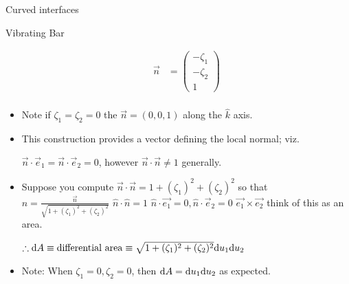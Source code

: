 \documentclass{article}
\begin{document}
\begin{section}{Curved interfaces}
\begin{subsection}{Vibrating Bar}
\begin{itemize}
\begin{align*}
		\vec{n} &= \begin{pmatrix}-\zeta_1 \\ -\zeta_2 \\ 1\end{pmatrix}\\
		\end{align*}
	      \item Note if $\zeta_1 = \zeta_2 = 0$ the $\vec{n} = (0,0,1)$ along the $\hat{k}$ axis.
	      \item This construction provides a vector defining the local normal; viz.
		
		$\vec{n}\cdot\vec{e}_1 = \vec{n}\cdot\vec{e}_2 = 0$, however $\vec{n}\cdot\vec{n} \neq 1$ generally.

	      \item Suppose you compute $\vec{n}\cdot\vec{n} = 1 + (\zeta_1)^2 + (\zeta_2)^2$ so that
		$\hat{n} = \frac{\vec{n}}{\sqrt{1 + (\zeta_1)^2 + (\zeta_2)^2}}$
		\newcommand{\nhat}[0]{\hat{n}}
		$\nhat\cdot\nhat = 1$
		$\nhat\cdot \vec{e_1} = 0, \nhat\cdot \vec{e}_2 = 0$
		$\vec{e_1}\times \vec{e_2}$ think of this as an area. 

		$\therefore \mathrm{d} A \equiv\mathrm{differential\ area}\equiv \sqrt{1+(\zeta_1)^2 + (\zeta_2)^2} \mathrm{d} u_1 \mathrm{d} u_2$
	      \item Note: When $\zeta_1 = 0, \zeta_2 = 0$, then $\mathrm{d} A = \mathrm{d} u_1 \mathrm{d} u_2$ as expected.



		   \end{itemize}

	      \end{subsection}
      \end{section}
\end{document}
